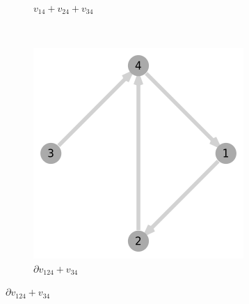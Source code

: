 \documentclass{juliacon}
\begin{document}
\begin{figure}[t]
\begin{subfigure}[b]{0.14\textwidth}
		\caption{$v_{14}+v_{24}+v_{34}$}
	\end{subfigure}
	~
	\begin{subfigure}[b]{0.14\textwidth}
		\includegraphics[width=\textwidth]{img/graph-3.png}
		\caption{$\partial v_{124}+v_{34}$}
	\end{subfigure}
\end{figure}
\end{document}
